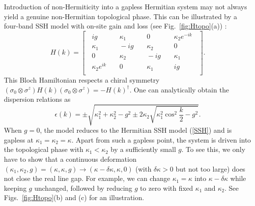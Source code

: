 \documentclass{tADP2e}
\theoremstyle{plain}
\theoremstyle{plain}
\theoremstyle{definition}
\begin{document}
Introduction of non-Hermiticity into a gapless Hermitian system may not always yield a genuine non-Hermitian topological phase. This can be illustrated by a four-band SSH model with on-site gain and loss (see Fig.~\ref{fig:Htopo}(a)) \cite{TK18}:
\begin{equation}
H(k)=\begin{bmatrix} 
\;\;ig\;\; & \;\;\kappa_1\;\; & \;\;0\;\; & \;\;\kappa_2e^{-ik}\;\;  \\
\;\;\kappa_1\;\; & \;\;-ig\;\; & \;\;\kappa_2\;\; & \;\;0\;\; \\
\;\;0\;\; & \;\;\kappa_2\;\; & \;\;-ig\;\; & \;\;\kappa_1\;\; \\
\;\;\kappa_2e^{ik}\;\; & \;\;0\;\; & \;\;\kappa_1\;\; & \;\;ig\;\; \\
\end{bmatrix}.
\label{4bm}
\end{equation}
This Bloch Hamiltonian respects a chiral symmetry $(\sigma_0\otimes\sigma^z)H(k)(\sigma_0\otimes\sigma^z)=-H(k)^\dag$. One can analytically obtain the dispersion relations as
\begin{equation}
\epsilon(k)=\pm\sqrt{\kappa_1^2+\kappa_2^2-g^2\pm2\kappa_2\sqrt{\kappa_1^2\cos^2\frac{k}{2}-g^2}}.
\end{equation}
When $g=0$, the model reduces to the %
Hermitian SSH model (\ref{SSH}) and is gapless at $\kappa_1=\kappa_2=\kappa$. Apart %
from such a gapless point, %
the system is driven into the topological phase with $\kappa_1<\kappa_2$ by a sufficiently small $g$. To see this, we only have to show that a continuous deformation  $(\kappa_1,\kappa_2,g)=(\kappa,\kappa,g)\to(\kappa-\delta\kappa,\kappa,0)$ (with $\delta\kappa>0$ but not too large) does not close the real line gap. For example, we can change $\kappa_1=\kappa$ into $\kappa-\delta\kappa$ while keeping $g$ unchanged, followed by reducing $g$ to zero with fixed $\kappa_1$ and $\kappa_2$. See Figs.~\ref{fig:Htopo}(b) and (c) for an illustration.
\end{document}
